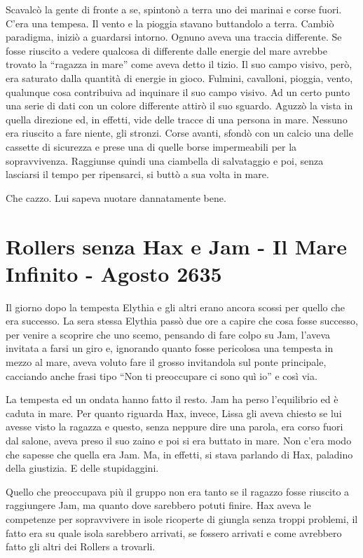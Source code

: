     Scavalcò la gente di fronte a se, spintonò a terra uno dei marinai e
    corse fuori. C'era una tempesa. Il vento e la pioggia stavano
    buttandolo a terra. Cambiò paradigma, iniziò a guardarsi intorno.
    Ognuno aveva una traccia differente. Se fosse riuscito a vedere
    qualcosa di differente dalle energie del mare avrebbe trovato la
    ``ragazza in mare'' come aveva detto il tizio. Il suo campo visivo,
    però, era saturato dalla quantità di energie in gioco. Fulmini,
    cavalloni, pioggia, vento, qualunque cosa contribuiva ad inquinare il
    suo campo visivo. Ad un certo punto una serie di dati con un colore
    differente attirò il suo sguardo. Aguzzò la vista in quella direzione
    ed, in effetti, vide delle tracce di una persona in mare. Nessuno era
    riuscito a fare niente, gli stronzi. Corse avanti, sfondò con un calcio
    una delle cassette di sicurezza e prese una di quelle borse
    impermeabili per la sopravvivenza. Raggiunse quindi una ciambella di
    salvataggio e poi, senza lasciarsi il tempo per ripensarci, si buttò a
    sua volta in mare.

    Che cazzo. Lui sapeva nuotare dannatamente bene.

  \section{Rollers senza Hax e Jam - Il Mare Infinito - Agosto 2635}

    Il giorno dopo la tempesta Elythia e gli altri erano ancora scossi per
    quello che era successo. La sera stessa Elythia passò due ore a capire
    che cosa fosse successo, per venire a scoprire che uno scemo, pensando
    di fare colpo su Jam, l'aveva invitata a farsi un giro e, ignorando
    quanto fosse pericolosa una tempesta in mezzo al mare, aveva voluto
    fare il grosso invitandola sul ponte principale, cacciando anche frasi
    tipo ``Non ti preoccupare ci sono quì io'' e così via.

    La tempesta ed un ondata hanno fatto il resto. Jam ha perso
    l'equilibrio ed è caduta in mare. Per quanto riguarda Hax, invece,
    Lissa gli aveva chiesto se lui avesse visto la ragazza e questo, senza
    neppure dire una parola, era corso fuori dal salone, aveva preso il suo
    zaino e poi si era buttato in mare. Non c'era modo che sapesse che
    quella era Jam. Ma, in effetti, si stava parlando di Hax, paladino
    della giustizia. E delle stupidaggini.

    Quello che preoccupava più il gruppo non era tanto se il ragazzo fosse
    riuscito a raggiungere Jam, ma quanto dove sarebbero potuti finire.
    Hax aveva le competenze per sopravvivere in isole ricoperte di giungla
    senza troppi problemi, il fatto era su quale isola sarebbero arrivati,
    se fossero arrivati e come avrebbero fatto gli altri dei Rollers a
    trovarli.

